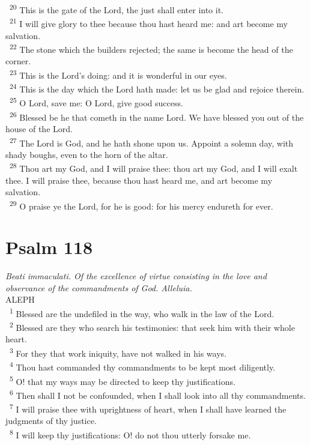 \documentclass[a5paper,12pt]{article}
\begin{document}
\begin{multicols*}{2}
~\textsuperscript{20} This is the gate of the Lord, the just shall enter into it.\\
~\textsuperscript{21} I will give glory to thee because thou hast heard me: and art become my salvation.\\
~\textsuperscript{22} The stone which the builders rejected; the same is become the head of the corner.\\
~\textsuperscript{23} This is the Lord's doing: and it is wonderful in our eyes.\\
~\textsuperscript{24} This is the day which the Lord hath made: let us be glad and rejoice therein.\\
~\textsuperscript{25} O Lord, save me: O Lord, give good success.\\
~\textsuperscript{26} Blessed be he that cometh in the name Lord. We have blessed you out of the house of the Lord.\\
~\textsuperscript{27} The Lord is God, and he hath shone upon us. Appoint a solemn day, with shady boughs, even to the horn of the altar.\\
~\textsuperscript{28} Thou art my God, and I will praise thee: thou art my God, and I will exalt thee. I will praise thee, because thou hast heard me, and art become my salvation.\\
~\textsuperscript{29} O praise ye the Lord, for he is good: for his mercy endureth for ever.\\

\section{Psalm 118}
\label{sec:orgeffd0c1}
\emph{Beati immaculati. Of the excellence of virtue consisting in the love and observance of the commandments of God. Alleluia.}\\

ALEPH\\

~\textsuperscript{1} Blessed are the undefiled in the way, who walk in the law of the Lord.\\
~\textsuperscript{2} Blessed are they who search his testimonies: that seek him with their whole heart.\\
~\textsuperscript{3} For they that work iniquity, have not walked in his ways.\\
~\textsuperscript{4} Thou hast commanded thy commandments to be kept most diligently.\\
~\textsuperscript{5} O! that my ways may be directed to keep thy justifications.\\
~\textsuperscript{6} Then shall I not be confounded, when I shall look into all thy commandments.\\
~\textsuperscript{7} I will praise thee with uprightness of heart, when I shall have learned the judgments of thy justice.\\
~\textsuperscript{8} I will keep thy justifications: O! do not thou utterly forsake me.\\


\end{multicols*}
\end{document}
